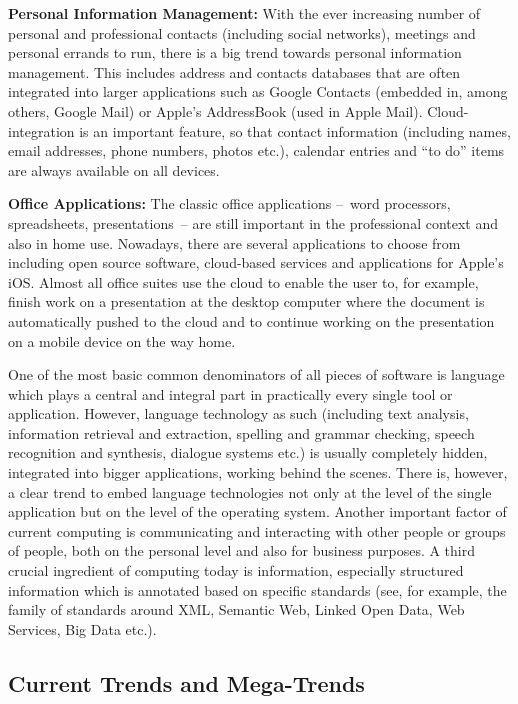 \documentclass[10pt, plain]{../../metanetpaper}
\begin{document}
\begin{multicols}{2}
\textbf{Personal Information Management:} With the ever increasing number of personal and professional contacts (including social networks), meetings and personal errands to run, there is a big trend towards personal information management. This includes address and contacts databases that are often integrated into larger applications such as Google Contacts (embedded in, among others, Google Mail) or Apple's AddressBook (used in Apple Mail). Cloud-integration is an important feature, so that contact information (including names, email addresses, phone numbers, photos etc.), calendar entries and ``to do'' items are always available on all devices. 

\textbf{Office Applications:} The classic office applications --~word processors, spreadsheets, presentations~-- are still important in the professional context and also in home use. Nowadays, there are several applications to choose from including open source software, cloud-based services and applications for Apple's iOS. Almost all office suites use the cloud to enable the user to, for example, finish work on a presentation at the desktop computer where the document is automatically pushed to the cloud and to continue working on the presentation on a mobile device on the way home.

One of the most basic common denominators of all pieces of software is language which plays a central and integral part in practically every single tool or application. However, language technology as such (including text analysis, information retrieval and extraction, spelling and grammar checking, speech recognition and synthesis, dialogue systems etc.) is usually completely hidden, integrated into bigger applications, working behind the scenes. There is, however, a clear trend to embed language technologies not only at the level of the single application but on the level of the operating system. Another important factor of current computing is communicating and interacting with other people or groups of people, both on the personal level and also for business purposes.  A third crucial ingredient of computing today is information, especially structured information which is annotated based on specific standards (see, for example, the family of standards around XML, Semantic Web, Linked Open Data, Web Services, Big Data etc.).

\subsection{Current Trends and Mega-Trends}
\label{sec:major-trends}


\end{multicols}
\end{document}
